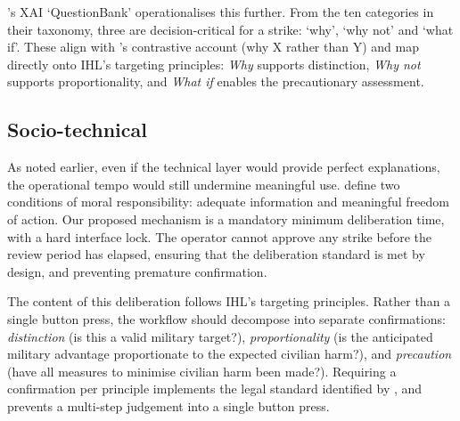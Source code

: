 \citet{liao2020questioning}'s XAI `QuestionBank' operationalises this further. From the ten categories in their taxonomy, three are decision-critical for a strike: `why', `why not' and `what if'. These align with \citet{miller2018explanationartificialintelligenceinsights}'s contrastive account (why X rather than Y) and map directly onto IHL's targeting principles: \textit{Why} supports distinction, \textit{Why not} supports proportionality, and \textit{What if} enables the precautionary assessment.

\subsection{Socio-technical}
As noted earlier, even if the technical layer would provide perfect explanations, the operational tempo would still undermine meaningful use. \citet{mhcof} define two conditions of moral responsibility: adequate information and meaningful freedom of action. Our proposed mechanism is a mandatory minimum deliberation time, with a hard interface lock. The operator cannot approve any strike before the review period has elapsed, ensuring that the deliberation standard is met by design, and preventing premature confirmation.

The content of this deliberation follows IHL's targeting principles. Rather than a single button press, the workflow should decompose into separate confirmations: \textit{distinction} (is this a valid military target?), \textit{proportionality} (is the anticipated military advantage proportionate to the expected civilian harm?), and \textit{precaution} (have all measures to minimise civilian harm been made?). Requiring a confirmation per principle implements the legal standard identified by \citet{ootlaws}, and prevents a multi-step judgement into a single button press.

